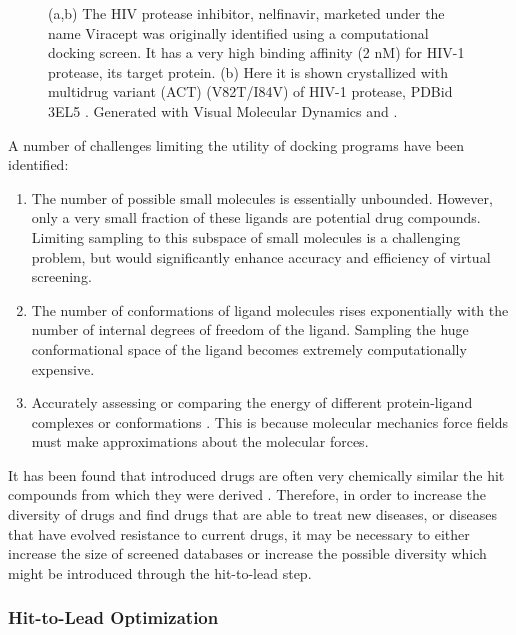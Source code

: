 \begin{figure}[h]
\begin{subfigure}[b]{0.3\textwidth}
        \label{fig:nelfinavir_docked}
        \caption{}
    \end{subfigure}
    \label{figure:nelfinavir}
    \caption{(a,b) The HIV protease inhibitor, nelfinavir, marketed under the name Viracept was originally identified using a computational docking screen.
It has a very high binding affinity (2 nM) for HIV-1 protease, its target protein.
(b) Here it is shown crystallized with multidrug variant (ACT) (V82T/I84V) of HIV-1 protease, PDBid 3EL5 \protect\cite{king2012extreme}.
Generated with Visual Molecular Dynamics \protect\cite{humphrey1996vmd} and \protect\cite{povray}.}
\end{figure}

A number of challenges limiting the utility of docking programs have been identified:
\begin{enumerate}
    \item The number of possible small molecules is essentially unbounded.
    However, only a very small fraction of these ligands are potential drug compounds.
    Limiting sampling to this subspace of small molecules is a challenging problem, but would significantly enhance accuracy and efficiency of virtual screening.
    \item The number of conformations of ligand molecules rises exponentially with the number of internal degrees of freedom of the ligand.
    Sampling the huge conformational space of the ligand becomes extremely computationally expensive.
    \item Accurately assessing or comparing the energy of different protein-ligand complexes or conformations \cite{shoichet2004virtual}.
    This is because molecular mechanics force fields must make approximations about the molecular forces.
\end{enumerate}

It has been found that introduced drugs are often very chemically similar the hit compounds from which they were derived \cite{proudfoot2002drugs}.
Therefore, in order to increase the diversity of drugs and find drugs that are able to treat new diseases, or diseases that have evolved resistance to current drugs, it may be necessary to either increase the size of screened databases or increase the possible diversity which might be introduced through the hit-to-lead step.

\subsubsection{Hit-to-Lead Optimization}
\label{subsubsection:hit_to_lead}


